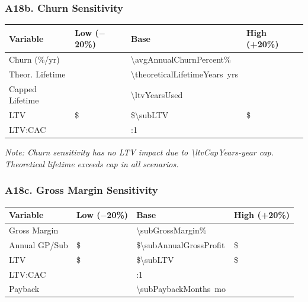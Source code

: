 \subsubsection*{A18b. Churn Sensitivity}
\begin{tabularx}{\linewidth}{l Y Y Y}
\toprule
\textbf{Variable} & \textbf{Low ($-$20\%)} & \textbf{Base} & \textbf{High (+20\%)} \\\midrule
Churn (\%/yr) & \validatepct{\sensChurnLowPercent}{\HCsensChurnLowPercent} & \num{\avgAnnualChurnPercent}\% & \validatepct{\sensChurnHighPercent}{\HCsensChurnHighPercent} \\
Theor. Lifetime & \validateyears{\lifetimeLowChurn}{\HClifetimeLowChurn} & \num{\theoreticalLifetimeYears}~yrs & \validateyears{\lifetimeHighChurn}{\HClifetimeHighChurn} \\
Capped Lifetime & \validate{\cappedLifetimeLowChurn}{\HCcappedLifetimeLowChurn} & \num{\ltvYearsUsed} & \validate{\cappedLifetimeHighChurn}{\HCcappedLifetimeHighChurn} \\
LTV & \$\validate{\ltvLowChurn}{\HCltvLowChurn} & \$\num{\subLTV} & \$\validate{\ltvHighChurn}{\HCltvHighChurn} \\
LTV:CAC & \validateratio{\ltvCacLowChurn}{\HCltvCacLowChurn} & \numint{\ltvCacRatio}:1 & \validateratio{\ltvCacHighChurn}{\HCltvCacHighChurn} \\
\bottomrule
\end{tabularx}

\medskip
\textit{Note: Churn sensitivity has no LTV impact due to \num{\ltvCapYears}-year cap. Theoretical lifetime exceeds cap in all scenarios.}

\subsubsection*{A18c. Gross Margin Sensitivity}
\begin{tabularx}{\linewidth}{l Y Y Y}
\toprule
\textbf{Variable} & \textbf{Low ($-$20\%)} & \textbf{Base} & \textbf{High (+20\%)} \\\midrule
Gross Margin & \validatepct{\sensGrossMarginLow}{\HCsensGrossMarginLow} & \num{\subGrossMargin}\% & \validatepct{\sensGrossMarginHigh}{\HCsensGrossMarginHigh} \\
Annual GP/Sub & \$\validate{\annualGPLowMargin}{\HCannualGPLowMargin} & \$\num{\subAnnualGrossProfit} & \$\validate{\annualGPHighMargin}{\HCannualGPHighMargin} \\
LTV & \$\validate{\ltvLowMargin}{\HCltvLowMargin} & \$\num{\subLTV} & \$\validate{\ltvHighMargin}{\HCltvHighMargin} \\
LTV:CAC & \validateratio{\ltvCacLowMargin}{\HCltvCacLowMargin} & \numint{\ltvCacRatio}:1 & \validateratio{\ltvCacHighMargin}{\HCltvCacHighMargin} \\
Payback & \validatemonths{\paybackLowMargin}{\HCpaybackLowMargin} & \num{\subPaybackMonths}~mo & \validatemonths{\paybackHighMargin}{\HCpaybackHighMargin} \\
\bottomrule
\end{tabularx}

